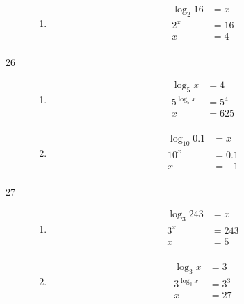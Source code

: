 \documentclass{exam}
\begin{document}
\begin{description}
\begin{enumerate}[a]
        \item 
          \begin{align*}
            \log_2 16 &= x \\
            2^x       &= 16 \\
            x         &= 4 \\
          \end{align*}
      \end{enumerate}

    \item[26]
      \begin{enumerate}[a]
        \item 
          \begin{align*}
            \log_5 x     &= 4 \\
            5^{\log_5 x} &= 5^4 \\
            x            &= 625 \\
          \end{align*}

        \item 
          \begin{align*}
            \log_{10} 0.1 &= x \\
            10^x          &= 0.1 \\
            x             &= -1 \\
          \end{align*}
      \end{enumerate}

    \item[27]
      \begin{enumerate}[a]
        \item 
          \begin{align*}
            \log_3 243 &= x \\
            3^x        &= 243 \\
            x          &= 5 \\
          \end{align*}

        \item 
          \begin{align*}
            \log_3 x     &= 3 \\
            3^{\log_3 x} &= 3^3 \\
            x            &= 27 \\
          \end{align*}
      \end{enumerate}


\end{description}
\end{document}
